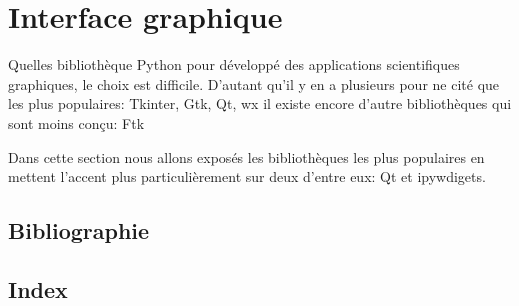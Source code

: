 \documentclass[11pt,fleqn]{book} %
\begin{document}


\chapter{Interface graphique}
Quelles bibliothèque Python pour développé des applications scientifiques graphiques, le choix est 
difficile. D'autant qu'il y en a plusieurs pour ne cité que les plus populaires: Tkinter, Gtk, Qt, wx  
il existe encore d'autre bibliothèques qui sont moins con\c{c}u: Ftk 

Dans cette section nous allons exposés les bibliothèques les plus populaires en mettent l'accent plus particulièrement sur deux d'entre eux: Qt et ipywdigets. 

\section{Bibliographie}
\section{Index}
\end{document}
